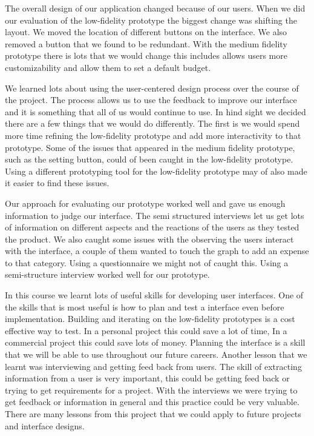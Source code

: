 \documentclass{chi2011}
\begin{document}
The overall design of our application changed because of our users. When we did
our evaluation of the low-fidelity prototype the biggest change was shifting the
layout. We moved the location of different buttons on the interface. We also
removed a button that we found to be redundant. With the medium fidelity
prototype there is lots that we would change this includes allows users more
customizability and allow them to set a default budget.

We learned lots about using the user-centered design process over the course of
the project. The process allows us to use the feedback to improve our interface
and it is something that all of us would continue to use. In hind sight we
decided there are a few things that we would do differently. The first is we
would spend more time refining the low-fidelity prototype and add more
interactivity to that prototype. Some of the issues that appeared in the
medium fidelity prototype, such as the setting button, could of been caught in
the low-fidelity prototype. Using a different prototyping tool for the
low-fidelity prototype may of also made it easier to find these issues.

Our approach for evaluating our prototype worked well and gave us enough
information to judge our interface. The semi structured interviews let us get
lots of information on different aspects and the reactions of the users as they
tested the product. We also caught some issues with the observing the users
interact with the interface, a couple of them wanted to touch the graph to add
an expense to that category. Using a questionnaire we might not of caught this.
Using a semi-structure interview worked well for our prototype.

In this course we learnt lots of useful skills for developing user interfaces.
One of the skills that is most useful is how to plan and test a interface even
before implementation. Building and iterating on the low-fidelity prototypes is
a cost effective way to test. In a personal project this could save a lot of
time, In a commercial project this could save lots of money. Planning the
interface is a skill that we will be able to use throughout our future careers.
Another lesson that we learnt was interviewing and getting feed back from users.
The skill of extracting information from a user is very important, this could be
getting feed back or trying to get requirements for a project. With the
interviews we were trying to get feedback or information in general and this
practice could be very valuable. There are many lessons from this project that
we could apply to future projects and interface designs.
\end{document}
